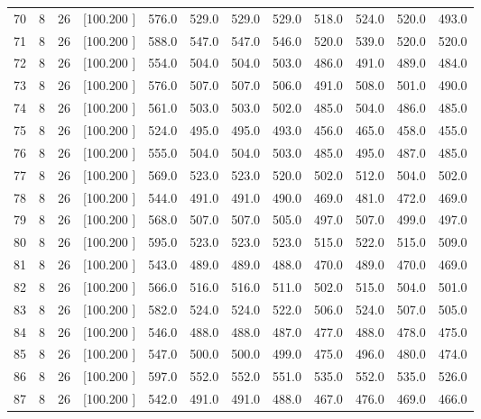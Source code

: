 \documentclass[12pt,a4paper]{article}
\begin{document}
\begin{center}
{\begin{tabular}{r r r r r r r r r r r r}
  70&  8& 26&[100.200   ]&   576.0&   529.0&   529.0&   529.0&   518.0&   524.0&   520.0&   493.0\\[-0.02in]
  71&  8& 26&[100.200   ]&   588.0&   547.0&   547.0&   546.0&   520.0&   539.0&   520.0&   520.0\\[-0.02in]
  72&  8& 26&[100.200   ]&   554.0&   504.0&   504.0&   503.0&   486.0&   491.0&   489.0&   484.0\\[-0.02in]
  73&  8& 26&[100.200   ]&   576.0&   507.0&   507.0&   506.0&   491.0&   508.0&   501.0&   490.0\\[-0.02in]
  74&  8& 26&[100.200   ]&   561.0&   503.0&   503.0&   502.0&   485.0&   504.0&   486.0&   485.0\\[-0.02in]
  75&  8& 26&[100.200   ]&   524.0&   495.0&   495.0&   493.0&   456.0&   465.0&   458.0&   455.0\\[-0.02in]
  76&  8& 26&[100.200   ]&   555.0&   504.0&   504.0&   503.0&   485.0&   495.0&   487.0&   485.0\\[-0.02in]
  77&  8& 26&[100.200   ]&   569.0&   523.0&   523.0&   520.0&   502.0&   512.0&   504.0&   502.0\\[-0.02in]
  78&  8& 26&[100.200   ]&   544.0&   491.0&   491.0&   490.0&   469.0&   481.0&   472.0&   469.0\\[-0.02in]
  79&  8& 26&[100.200   ]&   568.0&   507.0&   507.0&   505.0&   497.0&   507.0&   499.0&   497.0\\[-0.02in]
  80&  8& 26&[100.200   ]&   595.0&   523.0&   523.0&   523.0&   515.0&   522.0&   515.0&   509.0\\[-0.02in]
  81&  8& 26&[100.200   ]&   543.0&   489.0&   489.0&   488.0&   470.0&   489.0&   470.0&   469.0\\[-0.02in]
  82&  8& 26&[100.200   ]&   566.0&   516.0&   516.0&   511.0&   502.0&   515.0&   504.0&   501.0\\[-0.02in]
  83&  8& 26&[100.200   ]&   582.0&   524.0&   524.0&   522.0&   506.0&   524.0&   507.0&   505.0\\[-0.02in]
  84&  8& 26&[100.200   ]&   546.0&   488.0&   488.0&   487.0&   477.0&   488.0&   478.0&   475.0\\[-0.02in]
  85&  8& 26&[100.200   ]&   547.0&   500.0&   500.0&   499.0&   475.0&   496.0&   480.0&   474.0\\[-0.02in]
  86&  8& 26&[100.200   ]&   597.0&   552.0&   552.0&   551.0&   535.0&   552.0&   535.0&   526.0\\[-0.02in]
  87&  8& 26&[100.200   ]&   542.0&   491.0&   491.0&   488.0&   467.0&   476.0&   469.0&   466.0\\[-0.02in]

\end{tabular}}
\end{center}
\end{document}

